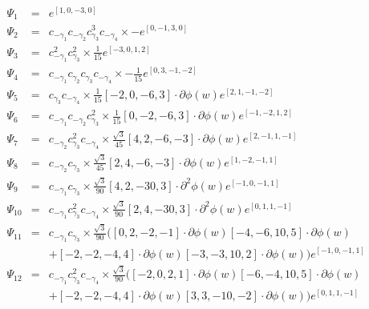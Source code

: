 \documentclass[a4paper,a4paper]{article}
\begin{document}
\begin{eqnarray}
\Psi_1 & = & e^{[1,0,-3,0]} \nonumber \\
\Psi_2 & = & c_{-\gamma_1}c_{-\gamma_2}c_{\gamma_3}^3 c_{-\gamma_4} \times -e^{[0,-1,3,0]} \nonumber\\ 
\Psi_3 & = & c_{-\gamma_1}^2 c_{\gamma_3}^2 \times \frac{1}{15}e^{[-3,0,1,2]} \nonumber \\
\Psi_4 & = & c_{-\gamma_1}c_{\gamma_2} c_{\gamma_3} c_{-\gamma_4} \times -\frac{1}{15}e^{[0,3,-1,-2]} \nonumber \\
\Psi_5 & = & c_{\gamma_3}c_{-\gamma_4}\times \frac{1}{15}[-2,0,-6,3]\cdot\partial\phi(w) e^{[2,1,-1,-2]} \nonumber\\
\Psi_6 & = & c_{-\gamma_1}c_{-\gamma_2}c_{\gamma_3}^2 \times \frac{1}{15}[0,-2,-6,3]\cdot\partial\phi(w) e^{[-1, -2,1,2]} \nonumber\\
\Psi_7 & = & c_{-\gamma_2}c_{\gamma_3}^2 c_{-\gamma_4}\times \frac{\sqrt{3}}{45}
             [4,2,-6,-3]\cdot\partial\phi(w) e^{[2,-1,1,-1]} \nonumber\\
\Psi_8 & = & c_{-\gamma_2}c_{\gamma_3}\times \frac{\sqrt{3}}{45}[2,4,-6,-3]\cdot\partial\phi(w) e^{[1,-2,-1,1]} \nonumber\\
\Psi_9 & = & c_{-\gamma_1}c_{\gamma_3}\times\frac{\sqrt{3}}{90}[4, 2, -30, 3]\cdot\partial^2\phi(w) e^{[-1,0,-1,1]} \nonumber\\
\Psi_{10} & = & c_{-\gamma_1}c_{\gamma_3}^2 c_{-\gamma_4}\times \frac{\sqrt{3}}{90}[2,4,-30,3]\cdot\partial^2\phi(w) e^{[0,1,1,-1]} \nonumber\\
\Psi_{11} & = & c_{-\gamma_1}c_{\gamma_3}\times\frac{\sqrt{3}}{90}\big( [0,2,-2,-1]\cdot\partial\phi(w)[-4,-6,10,5]\cdot\partial\phi(w) \nonumber\\
          & & + [-2, -2, -4, 4]\cdot\partial\phi(w)[-3,-3,10,2]\cdot\partial\phi(w) \big) e^{[-1,0,-1,1]} \nonumber\\
\Psi_{12} & = & c_{-\gamma_1}c_{\gamma_3}^2 c_{-\gamma_4}\times\frac{\sqrt{3}}{90}\big( [-2,0, 2,1]\cdot\partial\phi(w)[-6,-4,10,5]\cdot\partial\phi(w) \nonumber\\
          & &  + [-2, -2, -4, 4]\cdot\partial\phi(w)[3, 3,-10,-2]\cdot\partial\phi(w) \big) e^{[0,1,1,-1]} \nonumber
\end{eqnarray}
\end{document}
